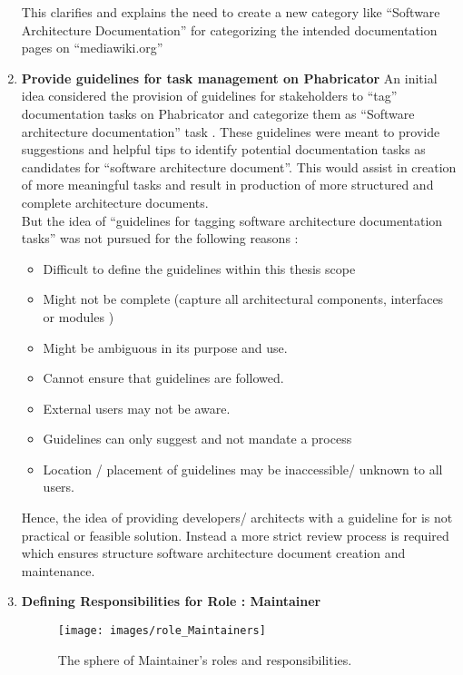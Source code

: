 \begin{enumerate}
This clarifies and explains the need to create a new category like \enquote{Software Architecture Documentation} for categorizing the intended documentation pages on \enquote{mediawiki.org}

\item \textbf{Provide guidelines for task management on Phabricator}
\indent An initial idea considered the provision of guidelines for stakeholders to \enquote{tag} documentation tasks on Phabricator and categorize them as \enquote{Software architecture documentation} task . These guidelines were meant to provide suggestions and helpful tips to identify potential documentation tasks as candidates for \enquote{software architecture document}. This would assist in creation of more meaningful tasks and result in production of more structured and complete architecture documents.
\\\indent But the idea of \enquote{guidelines for tagging software architecture documentation tasks} was not pursued for the following reasons :

\begin{itemize}
\item Difficult to define the guidelines within this thesis scope
\item Might not be complete (capture all architectural components, interfaces or modules )
\item Might be ambiguous in its purpose and use.
\item Cannot ensure that guidelines are followed.
\item External users may not be aware.
\item Guidelines can only suggest and not mandate a process
\item Location / placement of guidelines may be inaccessible/ unknown to all users. 
\end{itemize}
Hence, the idea of providing developers/ architects with a guideline for is not practical or feasible solution. Instead a more strict review process is required which ensures structure software architecture document creation and maintenance.


\item \textbf{Defining Responsibilities for Role : Maintainer}

\begin{figure}[H]
  \centering
  \texttt{[image: images/role\_Maintainers]}
  \caption[The sphere of Maintainer's roles and responsibilities]{The sphere of Maintainer's roles and responsibilities.}\label{fig:role_Maintainers}
\end{figure}


\end{enumerate}

